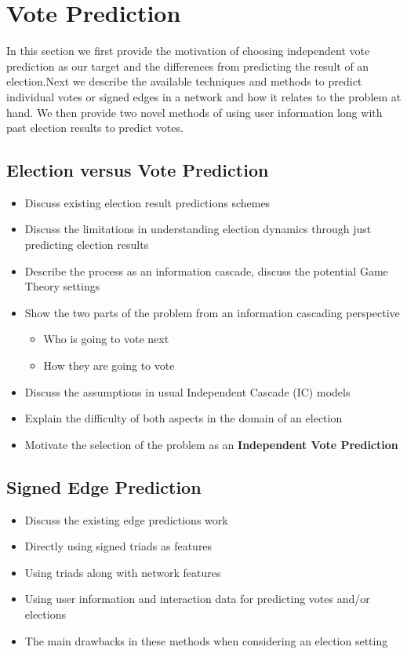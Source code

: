 \chapter{Vote Prediction}
\label{chp:vote-predicition}
In this section we first provide the motivation of choosing independent vote prediction as our target and the differences from predicting the result of an election.Next we describe the available techniques and methods to predict individual votes or signed edges in a network and how it relates to the problem at hand. We then provide two novel methods of using user information long with past election results to predict votes.

\section{Election versus Vote Prediction}
\begin{itemize}
    \item Discuss existing election result predictions schemes
    \item Discuss the limitations in understanding election dynamics through just predicting election results
    \item Describe the process as an information cascade, discuss the potential Game Theory settings
    \item Show the two parts of the problem from an information cascading perspective 
     \begin{itemize}
        \item Who is going to vote next
        \item How they are going to vote
    \end{itemize}
    \item Discuss the assumptions in usual Independent Cascade (IC) models
    \item Explain the difficulty of both aspects in the domain of an election 
    \item Motivate the selection of the problem as an \textbf{Independent Vote Prediction}
\end{itemize}
\section{Signed Edge Prediction}
\begin{itemize}
    \item Discuss the existing edge predictions work
    \item Directly using signed triads as features
    \item Using triads along with network features
    \item Using user information and interaction data for predicting votes and/or elections
    \item The main drawbacks in these methods when considering an election setting
\end{itemize}
